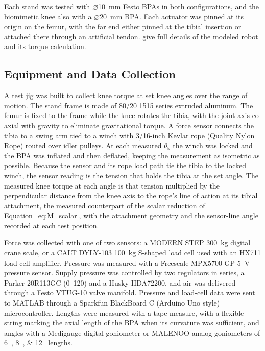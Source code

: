 \documentclass[utf8]{FrontiersinHarvard} %
\begin{document}
Each stand was tested with $\diameter$\qty{10}{\mm} Festo BPAs in both configurations, and the biomimetic knee also with a $\diameter$\qty{20}{\mm} BPA. Each actuator was pinned at its origin on the femur, with the far end either pinned at the tibial insertion or attached there through an artificial tendon. \citet{bolen_determination_2019,morrow_optimization_2020} give full details of the modeled robot and its torque calculation.

\subsection{Equipment and Data Collection}\label{sec:torque_equipment}

A test jig was built to collect knee torque at set knee angles over the range of motion. The stand frame is made of 80/20 1515 series extruded aluminum. The femur is fixed to the frame while the knee rotates the tibia, with the joint axis co-axial with gravity to eliminate gravitational torque. A force sensor connects the tibia to a swing arm tied to a winch with 3/16-inch Kevlar rope (Quality Nylon Rope) routed over idler pulleys. At each measured $\theta_\text{k}$ the winch was locked and the BPA was inflated and then deflated, keeping the measurement as isometric as possible. Because the sensor and its rope load path tie the tibia to the locked winch, the sensor reading is the tension that holds the tibia at the set angle. The measured knee torque at each angle is that tension multiplied by the perpendicular distance from the knee axis to the rope's line of action at its tibial attachment, the measured counterpart of the scalar reduction of Equation~\eqref{eq:M_scalar}, with the attachment geometry and the sensor-line angle recorded at each test position.

Force was collected with one of two sensors: a MODERN STEP \qty{300}{\kilo\gram} digital crane scale, or a CALT DYLY-103 \qty{100}{\kilo\gram} S-shaped load cell used with an HX711 load-cell amplifier. Pressure was measured with a Freescale MPX5700 GP \qty{5}{\volt} pressure sensor. Supply pressure was controlled by two regulators in series, a Parker 20R113GC (\qtyrange{0}{120}{\psi}) and a Husky HDA72200, and air was delivered through a Festo VTUG-10 valve manifold. Pressure and load-cell data were sent to MATLAB through a Sparkfun BlackBoard C (Arduino Uno style) microcontroller. Lengths were measured with a tape measure, with a flexible string marking the axial length of the BPA when its curvature was sufficient, and angles with a Medigauge digital goniometer or MALENOO analog goniometers of \qtylist{6;8;12}{\inch} lengths.
\end{document}

